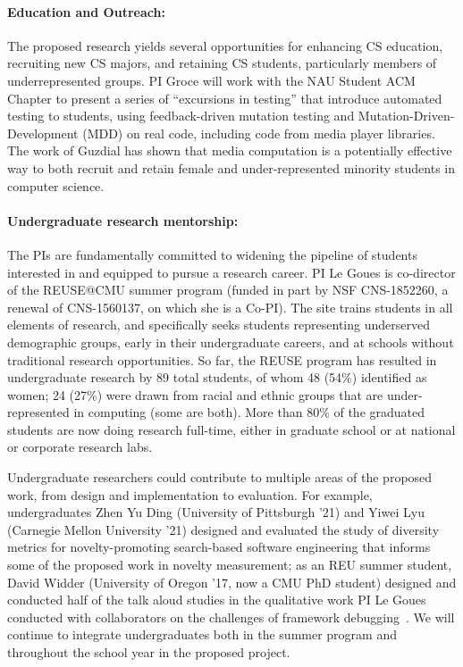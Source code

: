 \paragraph{Education and Outreach:}
The proposed research yields several opportunities for enhancing CS
education, recruiting new CS majors, and retaining CS students,
particularly members of underrepresented groups.  
PI Groce will work with the NAU Student ACM Chapter to present a
series of ``excursions in testing'' that introduce automated testing
to students, using feedback-driven mutation testing and Mutation-Driven-Development (MDD) on real code, including code from
media player libraries.  The work of Guzdial
\cite{Guzdial} has shown that media computation is a
potentially effective way to both recruit and retain female and
under-represented minority students in computer science.

\paragraph{Undergraduate research mentorship:} 
The PIs are fundamentally committed to widening the pipeline of students
interested in and equipped to pursue a research career. PI Le Goues is
co-director of the REUSE@CMU summer program (funded in part by NSF CNS-1852260,
a renewal of CNS-1560137, on which she is a Co-PI). The site trains students in
all elements of research, and specifically seeks students representing
underserved demographic groups, early in their undergraduate careers, and at
schools without traditional research opportunities.  So far, the REUSE program
has resulted in undergraduate research by 89 total students, of whom 48 (54\%)
identified as women; 24 (27\%) were drawn from racial and ethnic groups that are
under-represented in computing (some are both). More than 80\% of the graduated
students are now doing research full-time, either in graduate school or at
national or corporate research labs.

Undergraduate researchers could contribute to multiple areas of the proposed
work, from design and implementation to evaluation. For example, undergraduates
Zhen Yu Ding (University of Pittsburgh '21) and Yiwei Lyu (Carnegie Mellon
University '21) designed and evaluated the study of diversity metrics for
novelty-promoting search-based software engineering that informs some of the
proposed work in novelty measurement; as an REU summer student, David Widder
(University of Oregon '17, now a CMU PhD student) designed and conducted half of
the talk aloud studies in the qualitative work PI Le Goues conducted with
collaborators on the challenges of framework
debugging~\cite{frameworkDebugging}.  We will continue to integrate
undergraduates both in the summer program and throughout the school year in the
proposed project.
